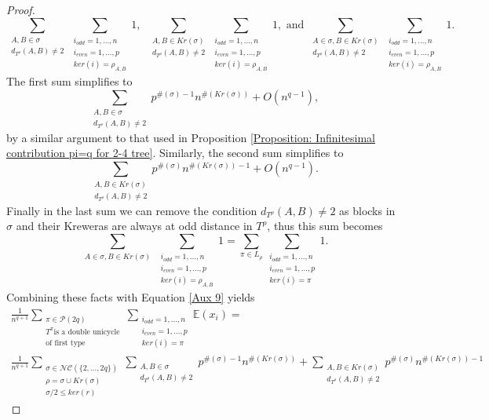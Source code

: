 \documentclass{article}
\theoremstyle{definition}
\newcommand{\E}{\mathbb{E}}
\newcommand{\cP}{\mathcal{P}}
\newcommand{\NC}{\mathcal{NC}}
\begin{document}
{\begin{proof}
$$\sum_{\substack{A,B\in \sigma \\ d_{T^\rho}(A,B)\neq 2}}\sum_{\substack{i_{odd}=1,\dots,n \\ i_{even}=1,\dots,p \\ ker(i)=\rho_{A,B}}}1, \phantom{a}\sum_{\substack{A,B\in Kr(\sigma) \\ d_{T^\rho}(A,B)\neq 2}}\sum_{\substack{i_{odd}=1,\dots,n \\ i_{even}=1,\dots,p \\ ker(i)=\rho_{A,B}}}1,\text{ and }\sum_{\substack{A\in\sigma , B\in Kr(\sigma) \\ d_{T^\rho}(A,B)\neq 2}}\sum_{\substack{i_{odd}=1,\dots,n \\ i_{even}=1,\dots,p \\ ker(i)=\rho_{A,B}}}1.$$
The first sum simplifies to 
$$\sum_{\substack{A,B\in \sigma \\ d_{T^\rho}(A,B)\neq 2}}p^{\#(\sigma)-1}n^{\#(Kr(\sigma))}+O(n^{q-1}),$$
by a similar argument to that used in Proposition \ref{Proposition: Infinitesimal contribution pi=q for 2-4 tree}. Similarly, the second sum simplifies to
$$\sum_{\substack{A,B\in Kr(\sigma) \\ d_{T^\rho}(A,B)\neq 2}}p^{\#(\sigma)}n^{\#(Kr(\sigma))-1}+O(n^{q-1}).$$
Finally in the last sum we can remove the condition $d_{T^\rho}(A,B)\neq 2$ as blocks in $\sigma$ and their Kreweras are always at odd distance in $T^\rho$, thus this sum becomes
$$\sum_{\substack{A\in\sigma , B\in Kr(\sigma)}}\sum_{\substack{i_{odd}=1,\dots,n \\ i_{even}=1,\dots,p \\ ker(i)=\rho_{A,B}}}1= \sum_{\pi\in L_\rho}\sum_{\substack{i_{odd}=1,\dots,n \\ i_{even}=1,\dots,p \\ ker(i)=\pi}}1.$$
Combining these facts with Equation \ref{Aux 9} yields
\begin{multline*}
\frac{1}{n^{q+1}}\sum_{\substack{\pi\in \cP(2q)\\ T^\pi \text{is a double unicycle} \\ \text{of first type} }}\sum_{\substack{i_{odd}=1,\dots,n \\ i_{even}=1,\dots,p \\ ker(i)=\pi}}\E(x_i)= \\
\frac{1}{n^{q+1}}\sum_{\substack{\sigma\in \NC(\{2,\dots,2q\})\\ \rho=\sigma\cup Kr(\sigma) \\ \sigma/2\leq ker(r)}}\sum_{\substack{A,B\in \sigma \\ d_{T^\rho}(A,B)\neq 2}}p^{\#(\sigma)-1}n^{\#(Kr(\sigma))}+\sum_{\substack{A,B\in Kr(\sigma) \\ d_{T^\rho}(A,B)\neq 2}}p^{\#(\sigma)}n^{\#(Kr(\sigma))-1} 

\end{multline*}
\end{proof}}
\end{document}
